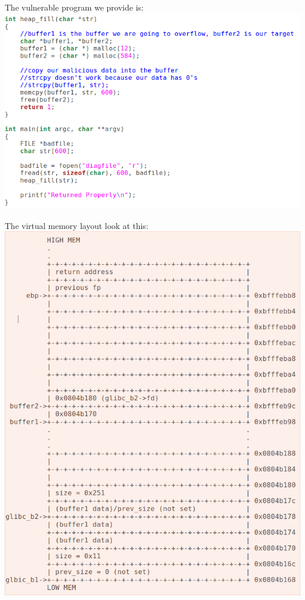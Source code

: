 \documentclass[12pt]{article}
\begin{document}
The vulnerable program we provide is:\\ 
\includegraphics[scale=0.5]{vul_prog.png}

The virtual memory layout look at this:\\
\includegraphics[scale=0.5]{compromised_layout.png}
\end{document}
